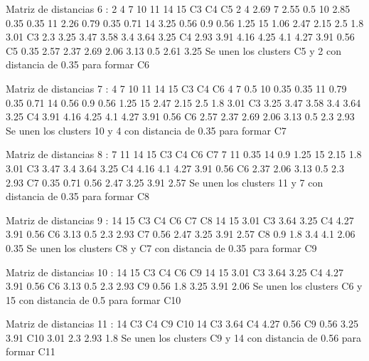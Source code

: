 \documentclass[a4paper, 12pt]{article}
\begin{document}
\begin{itemize}
\begin{Schunk}
\begin{Soutput}
Matriz de distancias 6 :
   2    4    7    10   11   14   15   C3   C4   C5
2                                                 
4  2.69                                           
7  2.55 0.5                                       
10 2.85 0.35 0.35                                 
11 2.26 0.79 0.35 0.71                            
14 3.25 0.56 0.9  0.56 1.25                       
15 1.06 2.47 2.15 2.5  1.8  3.01                  
C3 2.3  3.25 3.47 3.58 3.4  3.64 3.25             
C4 2.93 3.91 4.16 4.25 4.1  4.27 3.91 0.56        
C5 0.35 2.57 2.37 2.69 2.06 3.13 0.5  2.61 3.25   
Se unen los clusters C5 y 2 con distancia de 0.35 para formar C6 

Matriz de distancias 7 :
   4    7    10   11   14   15   C3   C4   C6
4                                            
7  0.5                                       
10 0.35 0.35                                 
11 0.79 0.35 0.71                            
14 0.56 0.9  0.56 1.25                       
15 2.47 2.15 2.5  1.8  3.01                  
C3 3.25 3.47 3.58 3.4  3.64 3.25             
C4 3.91 4.16 4.25 4.1  4.27 3.91 0.56        
C6 2.57 2.37 2.69 2.06 3.13 0.5  2.3  2.93   
Se unen los clusters 10 y 4 con distancia de 0.35 para formar C7 

Matriz de distancias 8 :
   7    11   14   15   C3   C4   C6   C7
7                                       
11 0.35                                 
14 0.9  1.25                            
15 2.15 1.8  3.01                       
C3 3.47 3.4  3.64 3.25                  
C4 4.16 4.1  4.27 3.91 0.56             
C6 2.37 2.06 3.13 0.5  2.3  2.93        
C7 0.35 0.71 0.56 2.47 3.25 3.91 2.57   
Se unen los clusters 11 y 7 con distancia de 0.35 para formar C8 

Matriz de distancias 9 :
   14   15   C3   C4   C6   C7   C8
14                                 
15 3.01                            
C3 3.64 3.25                       
C4 4.27 3.91 0.56                  
C6 3.13 0.5  2.3  2.93             
C7 0.56 2.47 3.25 3.91 2.57        
C8 0.9  1.8  3.4  4.1  2.06 0.35   
Se unen los clusters C8 y C7 con distancia de 0.35 para formar C9 

Matriz de distancias 10 :
   14   15   C3   C4   C6   C9
14                            
15 3.01                       
C3 3.64 3.25                  
C4 4.27 3.91 0.56             
C6 3.13 0.5  2.3  2.93        
C9 0.56 1.8  3.25 3.91 2.06   
Se unen los clusters C6 y 15 con distancia de 0.5 para formar C10 

Matriz de distancias 11 :
    14   C3   C4   C9  C10
14                        
C3  3.64                  
C4  4.27 0.56             
C9  0.56 3.25 3.91        
C10 3.01 2.3  2.93 1.8    
Se unen los clusters C9 y 14 con distancia de 0.56 para formar C11 


\end{Soutput}
\end{Schunk}
\end{itemize}
\end{document}

